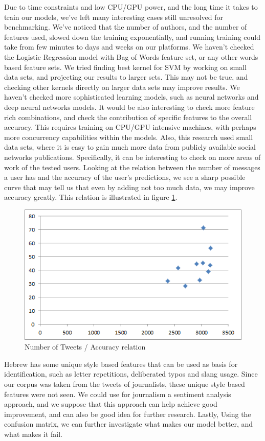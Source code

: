 \documentclass[a4paper]{article}
\begin{document}
Due to time constraints and low CPU/GPU power, and the long time it takes to train our models, we've left many interesting cases still unresolved for benchmarking.
We've noticed that the number of authors, and the number of features used, slowed down the training exponentially, and running training could take from few minutes to days and weeks on our platforms.
We haven't checked the Logistic Regression model with Bag of Words feature set, or any other words based feature sets.
We tried finding best kernel for SVM by working on small data sets, and projecting our results to larger sets. This may not be true, and checking other kernels directly on larger data sets may improve results.
We haven't checked more sophisticated learning models, such as neural networks and deep neural networks models.
It would be also interesting to check more feature rich combinations, and check the contribution of specific features to the overall accuracy. This requires training on CPU/GPU intensive machines, with perhaps more concurrency capabilities within the models.
Also, this research used small data sets, where it is easy to gain much more data from publicly available social networks publications.
Specifically, it can be interesting to check on more areas of work of the tested users.
Looking at the relation between the number of messages a user has and the accuracy of the user's predictions, we see a sharp possible curve that may tell us that even by adding not too much data, we may improve accuracy greatly. This relation is illustrated in figure \ref{fig:tweets accuracy relation}.
\begin{figure}[!h]
	\centering
	\includegraphics[width=.5\textwidth]{"figures/tweets_accuracy_relation"}
	\caption{Number of Tweets / Accuracy relation}
	\label{fig:tweets accuracy relation}
\end{figure}
Hebrew has some unique style based features that can be used as basis for identification, such as letter repetitions, deliberated typos and slang usage. Since our corpus was taken from the tweets of journalists, these unique style based features were not seen.
We could use for journalism a sentiment analysis approach, and we suppose that this approach can help achieve good improvement, and can also be good idea for further research.
Lastly, Using the confusion matrix, we can further investigate what makes our model better, and what makes it fail.
\end{document}
